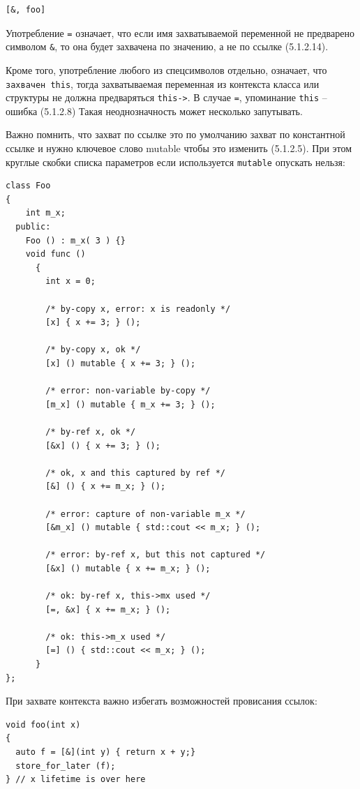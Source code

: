 \documentclass[a4paper,12pt,oneside]{article}
\begin{document}
\begin{lstlisting}
[&, foo]
\end{lstlisting}

Употребление \lstinline!=! означает, что если имя захватываемой переменной не предварено символом \lstinline!&!, то она будет захвачена по значению, а не по ссылке (5.1.2.14). 

Кроме того, употребление любого из спецсимволов отдельно, означает, что \lstinline!захвачен this!, тогда захватываемая переменная из контекста класса или структуры не должна предваряться \lstinline!this->!. В случае \lstinline!=!, упоминание \lstinline!this! -- ошибка (5.1.2.8)  Такая неоднозначность может несколько запутывать.

Важно помнить, что захват по ссылке это по умолчанию захват по константной ссылке и нужно ключевое слово mutable чтобы это изменить (5.1.2.5). При этом круглые скобки списка параметров если используется \lstinline!mutable! опускать нельзя:

\begin{lstlisting}
class Foo
{
    int m_x;
  public:
    Foo () : m_x( 3 ) {}
    void func ()
      {
        int x = 0;

        /* by-copy x, error: x is readonly */
        [x] { x += 3; } ();
        
        /* by-copy x, ok */
        [x] () mutable { x += 3; } ();

        /* error: non-variable by-copy */
        [m_x] () mutable { m_x += 3; } (); 

        /* by-ref x, ok */
        [&x] () { x += 3; } ();

        /* ok, x and this captured by ref */
        [&] () { x += m_x; } ();

        /* error: capture of non-variable m_x */
        [&m_x] () mutable { std::cout << m_x; } (); 

        /* error: by-ref x, but this not captured */
        [&x] () mutable { x += m_x; } (); 

        /* ok: by-ref x, this->mx used */
        [=, &x] { x += m_x; } ();

        /* ok: this->m_x used */
        [=] () { std::cout << m_x; } ();
      }
};
\end{lstlisting}

При захвате контекста важно избегать возможностей провисания ссылок:

\begin{lstlisting}
void foo(int x)
{
  auto f = [&](int y) { return x + y;}
  store_for_later (f);
} // x lifetime is over here
\end{lstlisting}
\end{document}
